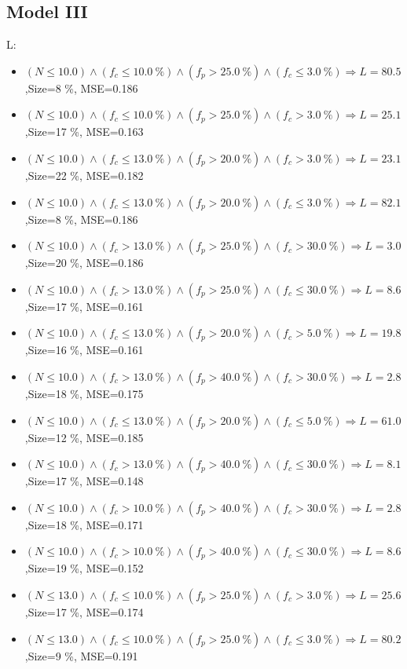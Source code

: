\documentclass[numbered]{CSL}
\begin{document}
\subsection{Model III}
L:
\begin{itemize}
\item $(N \leq 10.0) \land (f_c \leq 10.0~\%) \land (f_p > 25.0~\%) \land (f_c \leq 3.0~\%) \Rightarrow L = 80.5$,\hfill Size=8 \%, MSE=0.186
\item $(N \leq 10.0) \land (f_c \leq 10.0~\%) \land (f_p > 25.0~\%) \land (f_c > 3.0~\%) \Rightarrow L = 25.1$,\hfill Size=17 \%, MSE=0.163
\item $(N \leq 10.0) \land (f_c \leq 13.0~\%) \land (f_p > 20.0~\%) \land (f_c > 3.0~\%) \Rightarrow L = 23.1$,\hfill Size=22 \%, MSE=0.182
\item $(N \leq 10.0) \land (f_c \leq 13.0~\%) \land (f_p > 20.0~\%) \land (f_c \leq 3.0~\%) \Rightarrow L = 82.1$,\hfill Size=8 \%, MSE=0.186
\item $(N \leq 10.0) \land (f_c > 13.0~\%) \land (f_p > 25.0~\%) \land (f_c > 30.0~\%) \Rightarrow L = 3.0$,\hfill Size=20 \%, MSE=0.186
\item $(N \leq 10.0) \land (f_c > 13.0~\%) \land (f_p > 25.0~\%) \land (f_c \leq 30.0~\%) \Rightarrow L = 8.6$,\hfill Size=17 \%, MSE=0.161
\item $(N \leq 10.0) \land (f_c \leq 13.0~\%) \land (f_p > 20.0~\%) \land (f_c > 5.0~\%) \Rightarrow L = 19.8$,\hfill Size=16 \%, MSE=0.161
\item $(N \leq 10.0) \land (f_c > 13.0~\%) \land (f_p > 40.0~\%) \land (f_c > 30.0~\%) \Rightarrow L = 2.8$,\hfill Size=18 \%, MSE=0.175
\item $(N \leq 10.0) \land (f_c \leq 13.0~\%) \land (f_p > 20.0~\%) \land (f_c \leq 5.0~\%) \Rightarrow L = 61.0$,\hfill Size=12 \%, MSE=0.185
\item $(N \leq 10.0) \land (f_c > 13.0~\%) \land (f_p > 40.0~\%) \land (f_c \leq 30.0~\%) \Rightarrow L = 8.1$,\hfill Size=17 \%, MSE=0.148
\item $(N \leq 10.0) \land (f_c > 10.0~\%) \land (f_p > 40.0~\%) \land (f_c > 30.0~\%) \Rightarrow L = 2.8$,\hfill Size=18 \%, MSE=0.171
\item $(N \leq 10.0) \land (f_c > 10.0~\%) \land (f_p > 40.0~\%) \land (f_c \leq 30.0~\%) \Rightarrow L = 8.6$,\hfill Size=19 \%, MSE=0.152
\item $(N \leq 13.0) \land (f_c \leq 10.0~\%) \land (f_p > 25.0~\%) \land (f_c > 3.0~\%) \Rightarrow L = 25.6$,\hfill Size=17 \%, MSE=0.174
\item $(N \leq 13.0) \land (f_c \leq 10.0~\%) \land (f_p > 25.0~\%) \land (f_c \leq 3.0~\%) \Rightarrow L = 80.2$,\hfill Size=9 \%, MSE=0.191

\end{itemize}
\end{document}
